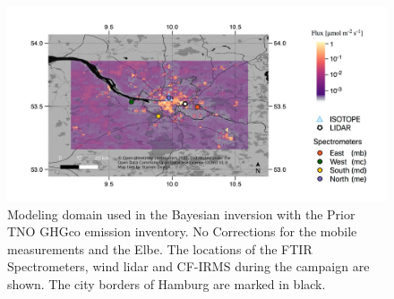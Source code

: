 \begin{figure}[htbp]
 \centering
 \includegraphics[width=1\textwidth]{figures/Appendix/Map/ModelingDomainFTIR.jpg}
 \caption[Modeling domain]{ Modeling domain used in the Bayesian inversion with the Prior TNO GHGco emission inventory. No Corrections for the mobile measurements and the Elbe. The locations of the FTIR Spectrometers, wind lidar and CF-IRMS during the campaign are shown. The city borders of Hamburg are marked in black. \cite{Forstmaier.2023}}
 \label{ModdelingDomain}
\end{figure}

